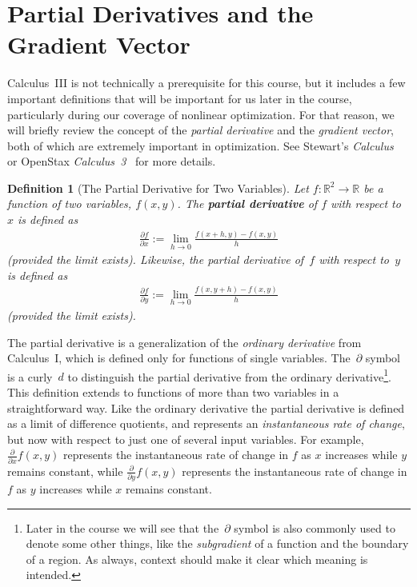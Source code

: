 \documentclass[11pt]{article}
\newtheorem*{definition}{Definition} %
\theoremstyle{definition} %
\begin{document}




\appendix

\newpage
\section{Partial Derivatives and the Gradient Vector}
\label{app:partial}

Calculus~III is not technically a prerequisite for this course, but it includes a few important definitions that will be important for us later in the course, particularly during our coverage of nonlinear optimization. For that reason, we will briefly review the concept of the \textit{partial derivative} and the \textit{gradient vector}, both of which are extremely important in optimization. See Stewart's \textit{Calculus}~\cite{stewart} or OpenStax \textit{Calculus~3}~\cite{openstax3} for more details.

\begin{definition}[The Partial Derivative for Two Variables]
	Let $f : \mathbb{R}^2 \to \mathbb{R}$ be a function of two variables, $f(x,y)$. The \textbf{partial derivative} of $f$ with respect to $x$ is defined as
	\begin{align*}
		\frac{\partial f}{\partial x} := \lim_{h \to 0} \frac{f(x+h,y) - f(x,y)}{h}
	\end{align*}
	(provided the limit exists). Likewise, the partial derivative of~$f$ with respect to~$y$ is defined as
	\begin{align*}
		\frac{\partial f}{\partial y} := \lim_{h \to 0} \frac{f(x,y+h) - f(x,y)}{h}
	\end{align*}
	(provided the limit exists).
\end{definition}

The partial derivative is a generalization of the \textit{ordinary derivative} from Calculus~I, which is defined only for functions of single variables. The~$\partial$ symbol is a curly~$d$ to distinguish the partial derivative from the ordinary derivative\footnote{Later in the course we will see that the~$\partial$ symbol is also commonly used to denote some other things, like the \textit{subgradient} of a function and the boundary of a region. As always, context should make it clear which meaning is intended.}. This definition extends to functions of more than two variables in a straightforward way. Like the ordinary derivative the partial derivative is defined as a limit of difference quotients, and represents an \textit{instantaneous rate of change}, but now with respect to just one of several input variables. For example, $\frac{\partial}{\partial x} f(x,y)$ represents the instantaneous rate of change in $f$ as $x$ increases while $y$ remains constant, while $\frac{\partial}{\partial y} f(x,y)$ represents the instantaneous rate of change in $f$ as $y$ increases while $x$ remains constant.
\end{document}
